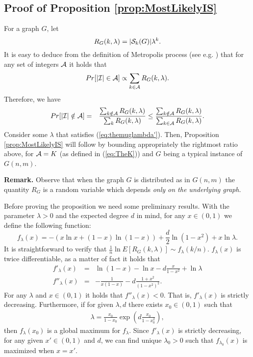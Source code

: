 \documentclass[a4paper,10pt]{article}
\begin{document}
\subsection{Proof of Proposition \ref{prop:MostLikelyIS}}
\label{sec:prop:MostLikelyIS}
For a graph $G$, let 
$$R_G(k,\lambda)=|{\cal S}_k(G)| \lambda^k.$$ 
It is easy to deduce from the definition of  Metropolis process
(see e.g. \cite{jerrum-planted}) that for any set of  integers 
${\cal A}$ it holds that
$$Pr[|{\cal I}|\in {\cal A}]\propto \sum_{k\in {\cal A}} R_G(k,\lambda).$$
Therefore, we have
\begin{eqnarray}
Pr[|{\cal I}|\notin {\cal A}]&=&\frac{\sum_{k\notin {\cal A}}R_G(k,\lambda)}{\sum_{k}R_G(k,\lambda)}
\leq \frac{\sum_{k\notin {\cal A}}R_G(k,\lambda)}{\sum_{k\in {\cal A}}R_G(k,\lambda)}. 
\label{eq:ratio2boundforMetr}
\end{eqnarray}
Consider some $\lambda$ that satisfies (\ref{eq:themuglambda'}).
Then, Proposition \ref{prop:MostLikelyIS} will follow by bounding
appropriately the rightmost ratio above, for ${\cal A}=K$ (as
defined in (\ref{eq:TheK})) and $G$ being a typical instance of
$G(n,m)$.
\\ \vspace{-.3cm}

\noindent
{\bf Remark.}
Observe that when the graph $G$ is distributed as in $G(n,m)$ the
quantity $R_G$ is a random variable which depends {\em only on the
underlying graph.} 
\\ \vspace{-.3cm}

\noindent
Before proving the proposition we need some preliminary results.
With the parameter $\lambda>0$ and the expected degree $d$ in mind, 
for any $x\in (0,1)$ we define the following function:
\begin{displaymath}
f_{\lambda}(x)=-(x\ln x+(1-x)\ln(1-x))+\frac{d}{2}\ln(1-x^2)+x\ln \lambda.
\end{displaymath}
It is straightforward to verify that $\frac{1}{n}\ln E[R_G(k,\lambda)]\sim f_{\lambda}(k/n)$.
$f_{\lambda}(x)$ is twice differentiable, as a matter of fact it holds that
\begin{eqnarray}
f'_{\lambda}(x)&=&\ln(1-x)-\ln x-d\frac{x}{1-x^2}+\ln \lambda \label{eq:f-lambdaPrime} \\
f''_{\lambda}(x)&=&-\frac{1}{x(1-x)}-d\frac{1+x^2}{(1-x^2)^2}. \label{eq:f-lambdaDPrime}
\end{eqnarray}
For any $\lambda$ and $x\in (0,1)$ it holds that $f''_{\lambda}(x)<0$. 
That is, $f'_{\lambda}(x)$ is strictly decreasing. Furthermore, if 
for given $\lambda, d$ there exists $x_0\in (0,1)$ such that 
\begin{eqnarray}\label{eq:LambdaMaxCond}
\lambda=\frac{x_0}{1-x_0}\exp\left(d\frac{x_0}{1-x^2_0}\right),
\end{eqnarray}
then $f_{\lambda}(x_0)$ is a global maximum for $f_{\lambda}$.
Since $f'_{\lambda}(x)$ is strictly decreasing, for any given
$x'\in (0,1)$ and $d$, we can find unique $\lambda_0>0$ such 
that $f_{\lambda_0}(x)$ is maximized when $x=x'$.
\end{document}
